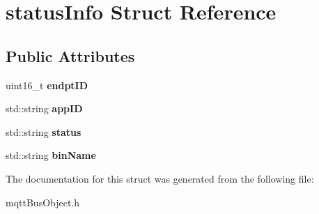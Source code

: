 \hypertarget{structstatusInfo}{}\section{status\+Info Struct Reference}
\label{structstatusInfo}
\subsection*{Public Attributes}
\begin{DoxyCompactItemize}
\item 
uint16\+\_\+t {\bfseries endpt\+ID}\hypertarget{structstatusInfo_a3ff13e88ee91a205f02525aa6a2b3fb3}{}\label{structstatusInfo_a3ff13e88ee91a205f02525aa6a2b3fb3}

\item 
std\+::string {\bfseries app\+ID}\hypertarget{structstatusInfo_afb82a14ea18ad373162e56475b5fa9c2}{}\label{structstatusInfo_afb82a14ea18ad373162e56475b5fa9c2}

\item 
std\+::string {\bfseries status}\hypertarget{structstatusInfo_af8397ebab9ee7c3da25f1053888f89be}{}\label{structstatusInfo_af8397ebab9ee7c3da25f1053888f89be}

\item 
std\+::string {\bfseries bin\+Name}\hypertarget{structstatusInfo_a8bc98c3079a42e24672d3e4e9ed1c365}{}\label{structstatusInfo_a8bc98c3079a42e24672d3e4e9ed1c365}

\end{DoxyCompactItemize}


The documentation for this struct was generated from the following file\+:\begin{DoxyCompactItemize}
\item 
mqtt\+Bus\+Object.\+h\end{DoxyCompactItemize}
